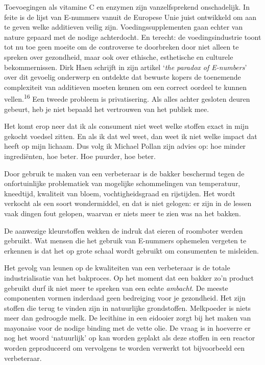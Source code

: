\documentclass[
  11pt,
  dutch,
]{memoir}
\begin{document}
Toevoegingen als vitamine C en enzymen zijn vanzelfsprekend
onschadelijk. In feite is de lijst van E-nummers vanuit de Europese Unie
juist ontwikkeld om aan te geven welke additieven veilig zijn.
Voedingssupplementen gaan echter van nature gepaard met de nodige
achterdocht. En terecht: de voedingsindustrie toont tot nu toe geen
moeite om de controverse te doorbreken door niet alleen te spreken over
gezondheid, maar ook over ethische, esthetische en culturele
bekommernissen. Dirk Haen schrijft in zijn artikel `\emph{the paradox of
E-numbers}' over dit gevoelig onderwerp en ontdekte dat bewuste kopers
de toenemende complexiteit van additieven moeten kennen om een correct
oordeel te kunnen vellen.\textsuperscript{16} Een tweede probleem is
privatisering. Als alles achter gesloten deuren gebeurt, heb je niet
bepaald het vertrouwen van het publiek mee.

Het komt erop neer dat ik als consument niet weet welke stoffen exact in
mijn gekocht voedsel zitten. En als ik dat wel weet, dan weet ik niet
welke impact dat heeft op mijn lichaam. Dus volg ik Michael Pollan zijn
advies op: hoe minder ingrediënten, hoe beter. Hoe puurder, hoe beter.

Door gebruik te maken van een verbeteraar is de bakker beschermd tegen
de onfortuinlijke problematiek van mogelijke schommelingen van
temperatuur, kneedtijd, kwaliteit van bloem, vochtigheidsgraad en
rijstijden. Het wordt verkocht als een soort wondermiddel, en dat is
niet gelogen: er zijn in de lessen vaak dingen fout gelopen, waarvan er
niets meer te zien was na het bakken.

De aanwezige kleurstoffen wekken de indruk dat eieren of roomboter
werden gebruikt. Wat mensen die het gebruik van E-nummers ophemelen
vergeten te erkennen is dat het op grote schaal wordt gebruikt om
consumenten te misleiden.

Het gevolg van leunen op de kwaliteiten van een verbeteraar is de totale
industrialisatie van het bakproces. Op het moment dat een bakker zo'n
product gebruikt durf ik niet meer te spreken van een echte
\emph{ambacht}. De meeste componenten vormen inderdaad geen bedreiging
voor je gezondheid. Het zijn stoffen die terug te vinden zijn in
natuurlijke grondstoffen. Melkpoeder is niets meer dan gedroogde melk.
De lecithine in een eidooier zorgt bij het maken van mayonaise voor de
nodige binding met de vette olie. De vraag is in hoeverre er nog het
woord `natuurlijk' op kan worden geplakt als deze stoffen in een reactor
worden geproduceerd om vervolgens te worden verwerkt tot bijvoorbeeld
een verbeteraar.
\end{document}
